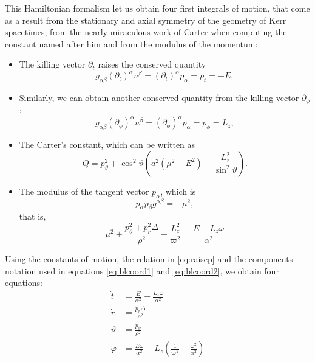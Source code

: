 This Hamiltonian formalism let us obtain four first integrals of motion\cite[pp. 898-899]{thorne73}, that come as a result from the stationary and axial symmetry of the geometry of Kerr spacetimes, from the nearly miraculous work of Carter when computing the constant named after him and from the modulus of the momentum:
\begin{itemize}
	\item The killing vector $\partial_t$ raises the conserved quantity
	\[
		g_{\alpha\beta}(\partial_t)^\alpha u^\beta = (\partial_t)^\alpha p_\alpha = p_t = -E,
	\]
	\item Similarly, we can obtain another conserved quantity from the killing vector $\partial_\phi$:
	\[
		g_{\alpha\beta}(\partial_\phi)^\alpha u^\beta = (\partial_\phi)^\alpha p_\alpha = p_\phi = L_z,
	\]
	\item The Carter's constant, which can be written as
	\begin{equation}
		\label{eq:carter}
		Q = p_\vartheta^2 + \cos^2\vartheta \left( a^2 \left( \mu^2 - E^2 \right) + \frac{L_z^2}{\sin^2\vartheta} \right).
	\end{equation}
	\item The modulus of the tangent vector $p_\alpha$, which is
	\begin{equation}
		\label{eq:modulus}
		p_\alpha p_\beta g^{\alpha\beta} = -\mu^2,
	\end{equation}
	that is,
	\[
		\mu^2 + \frac{p_\vartheta^2 + p_r^2 \Delta}{\rho^2} + \frac{L_z^2}{\varpi^2} = \frac{E - L_z \omega}{\alpha^2}
	\]
\end{itemize}



Using the constants of motion, the relation in \autoref{eq:raisep} and the components notation used in equations \ref{eq:blcoord1} and  \ref{eq:blcoord2}, we obtain four equations:
\begin{align}
	\label{eq:initt}
	\dot{t} &= \frac{E}{\alpha^2} - \frac{L_z \omega}{\alpha^2} \\
	\label{eq:initr}
	\dot{r} &= \frac{p_r \Delta}{\rho^2} \\
	\label{eq:inittheta}
	\dot{\vartheta} &= \frac{p_\vartheta}{\rho^2} \\
	\label{eq:initphi}
	\dot{\varphi} &= \frac{E \omega}{\alpha^2} + L_z\left( \frac{1}{\varpi^2} - \frac{\omega^2}{\alpha^2} \right)
\end{align}

